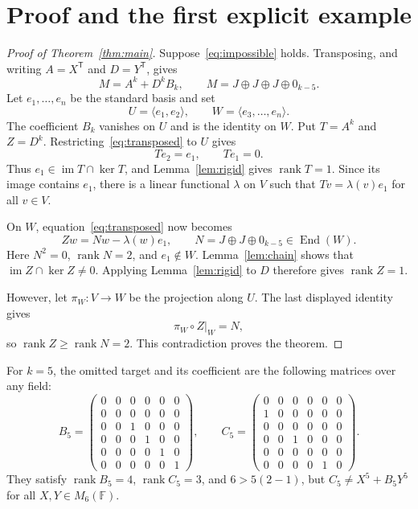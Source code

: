 \documentclass[11pt]{article}
\theoremstyle{remark}\newtheorem{remark}[theorem]{Remark}
\newcommand{\F}{\mathbb F}
\newcommand{\im}{\operatorname{im}}
\newcommand{\rk}{\operatorname{rank}}
\newcommand{\End}{\operatorname{End}}
\begin{document}
\section{Proof and the first explicit example}
\begin{proof}[Proof of Theorem~\ref{thm:main}]
Suppose~\eqref{eq:impossible} holds. Transposing, and writing $A=X^{\mathsf T}$ and $D=Y^{\mathsf T}$, gives
\begin{equation}\label{eq:transposed}
 M=A^k+D^kB_k,\qquad
 M=J\oplus J\oplus J\oplus0_{k-5}.
\end{equation}
Let $e_1,\ldots,e_n$ be the standard basis and set
\[
 U=\langle e_1,e_2\rangle,\qquad
 W=\langle e_3,\ldots,e_n\rangle.
\]
The coefficient $B_k$ vanishes on $U$ and is the identity on $W$. Put $T=A^k$ and $Z=D^k$. Restricting~\eqref{eq:transposed} to $U$ gives
\[
 Te_2=e_1,\qquad Te_1=0.
\]
Thus $e_1\in\im T\cap\ker T$, and Lemma~\ref{lem:rigid} gives $\rk T=1$. Since its image contains $e_1$, there is a linear functional $\lambda$ on $V$ such that $Tv=\lambda(v)e_1$ for all $v\in V$.

On $W$, equation~\eqref{eq:transposed} now becomes
\[
 Zw=Nw-\lambda(w)e_1,
\qquad
 N=J\oplus J\oplus0_{k-5}\in\End(W).
\]
Here $N^2=0$, $\rk N=2$, and $e_1\notin W$. Lemma~\ref{lem:chain} shows that $\im Z\cap\ker Z\ne0$. Applying Lemma~\ref{lem:rigid} to $D$ therefore gives $\rk Z=1$.

However, let $\pi_W:V\to W$ be the projection along $U$. The last displayed identity gives
\[
 \pi_W\circ Z|_W=N,
\]
so $\rk Z\ge\rk N=2$. This contradiction proves the theorem.
\end{proof}

For $k=5$, the omitted target and its coefficient are the following matrices over any field:
\[
 B_5=\begin{pmatrix}
 0&0&0&0&0&0\\0&0&0&0&0&0\\0&0&1&0&0&0\\
 0&0&0&1&0&0\\0&0&0&0&1&0\\0&0&0&0&0&1
 \end{pmatrix},\qquad
 C_5=\begin{pmatrix}
 0&0&0&0&0&0\\1&0&0&0&0&0\\0&0&0&0&0&0\\
 0&0&1&0&0&0\\0&0&0&0&0&0\\0&0&0&0&1&0
 \end{pmatrix}.
\]
They satisfy $\rk B_5=4$, $\rk C_5=3$, and $6>5(2-1)$, but $C_5\ne X^5+B_5Y^5$ for all $X,Y\in M_6(\F)$.
\end{document}
